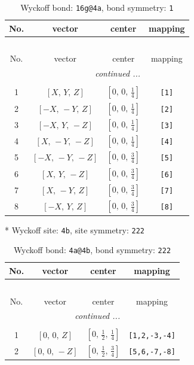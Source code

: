 \documentclass[fleqn,8pt]{jsarticle}
\begin{document}
\renewcommand{\arraystretch}{1.2}
\begin{longtable}{cccc}
\caption{Wyckoff bond: {\tt 16g@4a}, bond symmetry: {\tt 1}}
 \\
 \hline \hline
No. & vector & center & mapping \\ \hline \endfirsthead

\multicolumn{3}{l}{\tablename\ \thetable{}} \\
 \hline \hline
No. & vector & center & mapping \\ \hline \endhead

 \hline \hline
\multicolumn{3}{r}{\footnotesize\it continued ...} \\ \endfoot

 \hline \hline
\multicolumn{3}{r}{} \\ \endlastfoot

1 & $\left[ X,\, Y,\, Z \right]$ & $\left[ 0,\, 0,\, \frac{1}{4} \right]$ & {\tt [1]} \\ \hline
2 & $\left[ - X,\, - Y,\, Z \right]$ & $\left[ 0,\, 0,\, \frac{1}{4} \right]$ & {\tt [2]} \\ \hline
3 & $\left[ - X,\, Y,\, - Z \right]$ & $\left[ 0,\, 0,\, \frac{1}{4} \right]$ & {\tt [3]} \\ \hline
4 & $\left[ X,\, - Y,\, - Z \right]$ & $\left[ 0,\, 0,\, \frac{1}{4} \right]$ & {\tt [4]} \\ \hline
5 & $\left[ - X,\, - Y,\, - Z \right]$ & $\left[ 0,\, 0,\, \frac{3}{4} \right]$ & {\tt [5]} \\ \hline
6 & $\left[ X,\, Y,\, - Z \right]$ & $\left[ 0,\, 0,\, \frac{3}{4} \right]$ & {\tt [6]} \\ \hline
7 & $\left[ X,\, - Y,\, Z \right]$ & $\left[ 0,\, 0,\, \frac{3}{4} \right]$ & {\tt [7]} \\ \hline
8 & $\left[ - X,\, Y,\, Z \right]$ & $\left[ 0,\, 0,\, \frac{3}{4} \right]$ & {\tt [8]} \\
\end{longtable}
* Wyckoff site: {\tt 4b}, site symmetry: {\tt 222}
\renewcommand{\arraystretch}{1.2}
\begin{longtable}{cccc}
\caption{Wyckoff bond: {\tt 4a@4b}, bond symmetry: {\tt 222}}
 \\
 \hline \hline
No. & vector & center & mapping \\ \hline \endfirsthead

\multicolumn{3}{l}{\tablename\ \thetable{}} \\
 \hline \hline
No. & vector & center & mapping \\ \hline \endhead

 \hline \hline
\multicolumn{3}{r}{\footnotesize\it continued ...} \\ \endfoot

 \hline \hline
\multicolumn{3}{r}{} \\ \endlastfoot

1 & $\left[ 0,\, 0,\, Z \right]$ & $\left[ 0,\, \frac{1}{2},\, \frac{1}{4} \right]$ & {\tt [1,2,-3,-4]} \\ \hline
2 & $\left[ 0,\, 0,\, - Z \right]$ & $\left[ 0,\, \frac{1}{2},\, \frac{3}{4} \right]$ & {\tt [5,6,-7,-8]} \\
\end{longtable}
\end{document}
